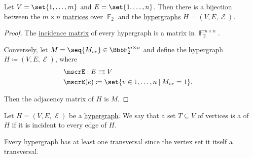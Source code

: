 \begin{proposition}\label{thm:graphs_as_linear_transformations}
  Let \( V = \set{ 1, \ldots, m } \) and \( E = \set{ 1, \ldots, n } \). Then there is a bijection between the \( m \times n \) \hyperref[def:matrix]{matrices} over \( \BbbF_2 \) and the \hyperref[def:hypergraph]{hypergraphs} \( H = (V, E, \mscrE) \).
\end{proposition}
\begin{proof}
  The \hyperref[def:hypergraph_incidence_matrix]{incidence matrix} of every hypergraph is a matrix in \( \BbbF_2^{m \times n} \).

  Conversely, let \( M = \seq{ M_{ve} } \in \BbbF_2^{m \times n} \) and define the hypergraph \( H \coloneqq (V, E, \mscrE) \), where
  \begin{equation*}
    \begin{aligned}
      &\mscrE: E \multto V \\
      &\mscrE(e) \coloneqq \set{ v \in 1, \ldots, n \given M_{ve} = 1 }.
    \end{aligned}
  \end{equation*}

  Then the adjacency matrix of \( H \) is \( M \).
\end{proof}

\begin{definition}\label{def:hypergraph_transversal}
  Let \( H = (V, E, \mscrE) \) be a \hyperref[def:hypergraph]{hypergraph}. We say that a set \( T \subseteq V \) of vertices is a  of \( H \) if it is incident to every edge of \( H \).
\end{definition}

\begin{example}\label{ex:hypergraph_vertex_set_is_transversal}
  Every hypergraph has at least one transversal since the vertex set it itself a transversal.
\end{example}

